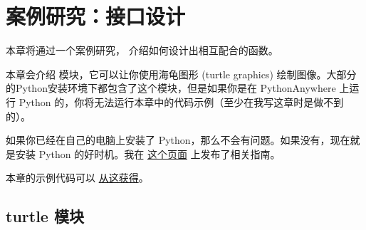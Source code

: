 

\chapter{案例研究：接口设计}
\label{turtlechap}


本章将通过一个案例研究， 介绍如何设计出相互配合的函数。

本章会介绍  模块，它可以让你使用海龟图形 (turtle graphics) 绘制图像。大部分的Python安装环境下都包含了这个模块，但是如果你是在 PythonAnywhere 上运行 Python 的，你将无法运行本章中的代码示例（至少在我写这章时是做不到的）。

如果你已经在自己的电脑上安装了 Python，那么不会有问题。如果没有，现在就是安装 Python 的好时机。我在 \href{http://tinyurl.com/thinkpython2e}{这个页面} 上发布了相关指南。

本章的示例代码可以 \href{http://thinkpython2.com/code/polygon.py}{从这获得}。

\section{turtle 模块}
\label{turtle}


